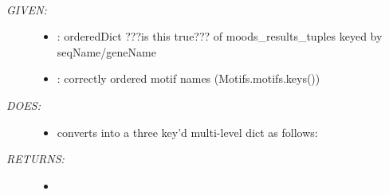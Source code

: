 \documentclass[letterpaper,10pt,english]{sphinxmanual}
\begin{document}
\begin{fulllineitems}
\label{code:gfunc.motifs.process_MOODS_results}~\begin{description}
\item[{\emph{GIVEN:}}] \leavevmode\begin{itemize}
\item {} 
: orderedDict ???is this true??? of moods\_results\_tuples keyed by seqName/geneName

\item {} 
: correctly ordered motif names (Motifs.motifs.keys())

\end{itemize}

\item[{\emph{DOES:}}] \leavevmode\begin{itemize}
\item {} 
converts  into a three key'd multi-level dict as follows:

\end{itemize}

\item[{\emph{RETURNS:}}] \leavevmode\begin{itemize}
\item {} 

\end{itemize}

\end{description}

\end{fulllineitems}

\end{document}
